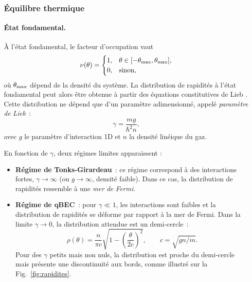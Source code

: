 \subsubsection{Équilibre thermique}

\paragraph{État fondamental.}

À l’état fondamental,  le facteur d’occupation vaut
\begin{equation}
	\nu(\theta) = 
	\begin{cases}
		1, & \theta \in [-\theta_{\tiny \mathrm{max}}, \theta_{\tiny \mathrm{max}}], \\
		0, & \text{sinon},
	\end{cases}	
\end{equation}
où $\theta_{\tiny \mathrm{max}}$ dépend de la densité du système. La distribution de rapidités à l’état fondamental peut alors être obtenue à partir des équations constitutives de Lieb \cite{LL_1963_1}. Cette distribution ne dépend que d’un paramètre adimensionné, appelé \emph{paramètre de Lieb} :
\begin{equation}\label{chap2:eq:gamma.1}
\gamma = \frac{mg}{\hbar^2 n}, 
\end{equation}
avec $g$ le paramètre d’interaction 1D et $n$ la densité linéique du gaz.

En fonction de $\gamma$, deux régimes limites apparaissent :

\begin{itemize}[label = $\bullet$]
    \item \textbf{Régime de Tonks-Girardeau} : ce régime correspond à des interactions fortes, $\gamma \to \infty$ (ou $g \to \infty$, densité faible). Dans ce cas, la distribution de rapidités ressemble à une \emph{mer de Fermi}. %

    \item \textbf{Régime de \gls{qBEC}} : pour $\gamma \ll 1$, les interactions sont faibles et la distribution de rapidités se déforme par rapport à la mer de Fermi. Dans la limite $\gamma \to 0$, la distribution attendue est un demi-cercle :
    \begin{equation}
        \rho(\theta) = \frac{n}{\pi c} \sqrt{1 - \left ( \frac{\theta}{2c} \right )^2}, \qquad c = \sqrt{gn/m}.
    \end{equation}
    Pour des $\gamma$ petits mais non nuls, la distribution est proche du demi-cercle mais présente une discontinuité aux bords, comme illustré sur la Fig.~\ref{fig:rapidites}. 
\end{itemize}


